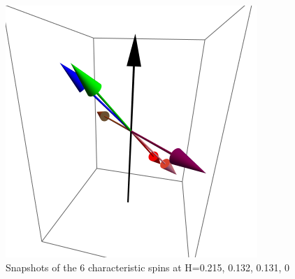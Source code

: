 \documentclass{article}
\begin{document}
\begin{figure}[ht]
\includegraphics[scale=0.22]{HVariedData/Pictures/010Dec216.png}
\caption{Snapshots of the 6 characteristic spins at H=0.215, 0.132, 0.131, 0}
\end{figure}
\end{document}
